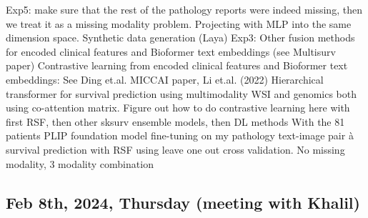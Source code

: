 \documentclass{article}%
\begin{document}
\newline%
\newline%
%
Exp5: make sure that the rest of the pathology reports were indeed missing, then we treat it as a missing modality problem. %
\newline%
\newline%
%
Projecting with MLP into the same dimension space. %
\newline%
\newline%
%
Synthetic data generation (Laya)%
\newline%
\newline%
%
Exp3: Other fusion methods for encoded clinical features and Bioformer text embeddings (see Multisurv paper) %
\newline%
\newline%
%
Contrastive learning from encoded clinical features and Bioformer text embeddings: %
\newline%
\newline%
%
See Ding et.al. MICCAI paper, Li et.al. (2022) Hierarchical transformer for survival prediction using multimodality WSI and genomics both using co{-}attention matrix. %
\newline%
\newline%
%
Figure out how to do contrastive learning here with first RSF, then other sksurv ensemble models, then DL methods %
\newline%
\newline%
%
With the 81 patients%
\newline%
\newline%
%
PLIP foundation model fine{-}tuning on my pathology text{-}image pair à survival prediction with RSF using leave one out cross validation. %
\newline%
\newline%
%
No missing modality, 3 modality combination %
\newline%
\newline%
%
%
\newline%
\newline%
%
\subsection{Feb 8th, 2024, Thursday (meeting with Khalil)}%
\label{subsec:Feb8th,2024,Thursday(meetingwithKhalil)}%
\end{document}
